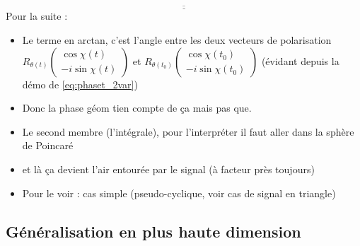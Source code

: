 \[\underline{\overline{\qquad\qquad\qquad\qquad\qquad\qquad\qquad\qquad\qquad\qquad\qquad\qquad}}\]
Pour la suite :
\begin{itemize}
	
	\item Le terme en arctan, c'est l'angle entre les deux vecteurs de polarisation $R_{\theta(t)} \begin{pmatrix} \cos\chi(t) \\ -i\sin\chi(t) \end{pmatrix}$ et $R_{\theta(t_0)} \begin{pmatrix} \cos\chi(t_0) \\ -i\sin\chi(t_0) \end{pmatrix}$ (évidant depuis la démo de \eqref{eq:phaset_2var})
	
	\item Donc la phase géom tien compte de ça mais pas que.
	
	\item Le second membre (l'intégrale), pour l'interpréter il faut aller dans la sphère de Poincaré
	
	\item et là ça devient l'air entourée par le signal (à facteur près toujours)
	
	\item Pour le voir : cas simple (pseudo-cyclique, voir cas de signal en triangle)	
	
	
	
	
\end{itemize}




\subsection{Généralisation en plus haute dimension} \label{subsec:gene_AM-FM-PM}

